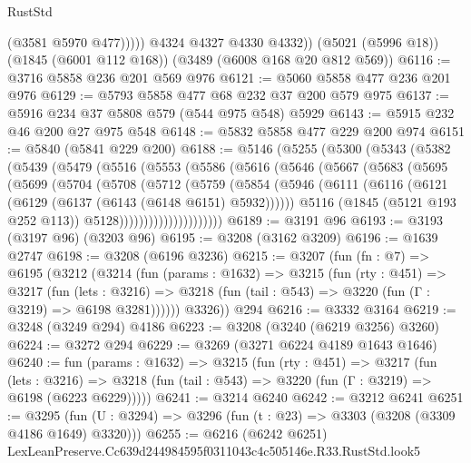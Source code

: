 \begin{lexlean}{RustStd}
\begin{coremodule}
                (@3581 @5970 @477)))))
        @4324
        @4327
        @4330
        @4332))
    (@5021 (@5996 @18))
    (@1845 (@6001 @112 @168))
    (@3489 (@6008 @168 @20 @812 @569))
@6116 := @3716 @5858 @236 @201 @569 @976
@6121 := @5060 @5858 @477 @236 @201 @976
@6129 := @5793 @5858 @477 @68 @232 @37 @200 @579 @975
@6137 := @5916 @234 @37 @5808 @579 (@544 @975 @548) @5929
@6143 := @5915 @232 @46 @200 @27 @975 @548
@6148 := @5832 @5858 @477 @229 @200 @974
@6151 := @5840 (@5841 @229 @200)
@6188 := @5146
    (@5255
      (@5300
        (@5343
          (@5382
            (@5439
              (@5479
                (@5516
                  (@5553
                    (@5586
                      (@5616
                        (@5646
                          (@5667
                            (@5683
                              (@5695
                                (@5699
                                  (@5704
                                    (@5708
                                      (@5712
                                        (@5759
                                          (@5854
                                            (@5946
                                              (@6111
                                                (@6116
                                                  (@6121
                                                    (@6129 (@6137 (@6143 (@6148 @6151) @5932))))))
                                              @5116
                                              (@1845 (@5121 @193 @252 @113))
                                              @5128)))))))))))))))))))))
@6189 := @3191 @96
@6193 := @3193 (@3197 @96) (@3203 @96)
@6195 := @3208 (@3162 @3209)
@6196 := @1639 @2747
@6198 := @3208 (@6196 @3236)
@6215 := @3207
    (fun (fn : @7) =>
    @6195
      (@3212
        (@3214
          (fun (params : @1632) =>
          @3215
            (fun (rty : @451) =>
            @3217
              (fun (lets : @3216) =>
              @3218 (fun (tail : @543) => @3220 (fun (Γ : @3219) => @6198 @3281))))))
        @3326))
    @294
@6216 := @3332 @3164
@6219 := @3248 (@3249 @294) @4186
@6223 := @3208 (@3240 (@6219 @3256) @3260)
@6224 := @3272 @294
@6229 := @3269 (@3271 @6224 @4189 @1643 @1646)
@6240 := fun (params : @1632) =>
  @3215
    (fun (rty : @451) =>
    @3217
      (fun (lets : @3216) =>
      @3218 (fun (tail : @543) => @3220 (fun (Γ : @3219) => @6198 (@6223 @6229)))))
@6241 := @3214 @6240
@6242 := @3212 @6241
@6251 := @3295 (fun (U : @3294) => @3296 (fun (t : @23) => @3303 (@3208 (@3309 @4186 @1649) @3320)))
@6255 := @6216 (@6242 @6251) LexLeanPreserve.Cc639d244984595f0311043c4c505146e.R33.RustStd.look5

\end{coremodule}
\end{lexlean}
